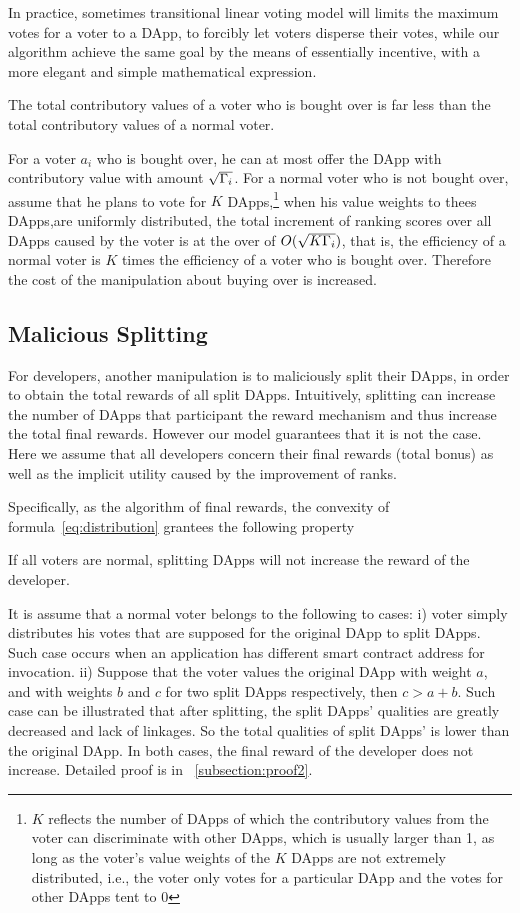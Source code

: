 In practice, sometimes transitional  linear voting model will limits the maximum votes for a voter to a DApp, to forcibly let voters disperse their votes, while our algorithm achieve the same goal by the means of essentially incentive,  with a more elegant and simple mathematical expression. 

\begin{corollary}
	The total contributory values of a  voter who is bought over is far less than the total contributory values of a normal voter.
\end{corollary}
For a voter $a_i$ who is bought over, he can at most offer the DApp with contributory value with amount $\sqrt{\Gamma_i}$. For a normal voter who is not bought over, assume that he plans to vote for $K$ DApps,\footnote{$K$ reflects the number of DApps of which the contributory values from the voter can discriminate with other DApps, which is usually larger than 1, as long as the voter's value weights of the $K$ DApps are not extremely distributed, i.e., the voter only votes for a particular DApp and the votes for other DApps tent to 0} when  his value weights to thees DApps,are uniformly distributed, the total increment of ranking scores  over all DApps caused by the voter is at the over of $O(\sqrt{K\Gamma_i})$, that is, the efficiency of a normal voter is $K$ times the efficiency of a voter who is bought over. Therefore the cost of the manipulation about buying over is increased.

\subsection{Malicious Splitting}
\label{subsec:5.2}
For developers, another manipulation is to maliciously split their DApps, in order to obtain the total rewards of all split DApps. Intuitively, splitting can increase the number of DApps that participant the reward mechanism and thus increase the total final rewards. However our model guarantees that it is not the case. Here we assume that all developers concern their final rewards (total bonus) as well as the implicit utility caused by the improvement of ranks.

Specifically, as the algorithm of final rewards, the convexity of formula~\ref{eq:distribution} grantees the following property
\begin{property}
	\label{p2}
    If all voters are normal, splitting DApps will not increase the reward of the developer. 
\end{property}
It is assume that a normal voter belongs to the following to cases: i) voter simply distributes his votes that are supposed for the original DApp to split DApps. Such case occurs when an application has different smart contract address for invocation. ii) Suppose that the voter values the original DApp with weight $a$, and with weights $b$ and $c$ for two split DApps respectively, then $c>a+b$. Such case can be illustrated that after splitting, the split DApps' qualities are greatly decreased and lack of linkages. So the total qualities of split DApps' is lower than the original DApp. In both cases, the final reward of the developer does not increase. Detailed proof  is in ~\ref{subsection:proof2}.

